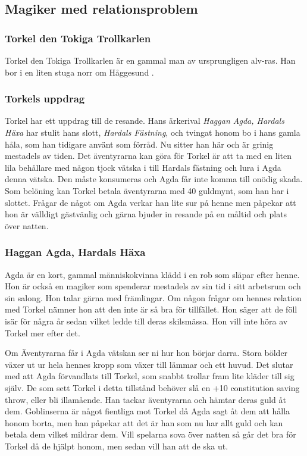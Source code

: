 \subsection{Magiker med relationsproblem}
\label{magikerMedRelationsproblem}
%
\subsubsection{Torkel den Tokiga Trollkarlen}
Torkel den Tokiga Trollkarlen är en gammal man av ursprungligen alv-ras. Han bor i en liten stuga norr om Håggesund \sectiondescribe{\ref{torkelsStuga}}.
%
\subsubsection{Torkels uppdrag}
Torkel har ett uppdrag till de resande. Hans ärkerival \textit{Haggan Agda, Hardals Häxa} har stulit hans slott, \textit{Hardals Fästning}, och tvingat honom bo i hans gamla håla, som han tidigare använt som förråd. Nu sitter han här och är grinig mestadels av tiden. Det äventyrarna kan göra för Torkel är att ta med en liten lila behållare med någon tjock vätska i till Hardals fästning och lura i Agda denna vätska. Den måste konsumeras och Agda får inte komma till onödig skada. Som belöning kan Torkel betala äventyrarna med 40 guldmynt, som han har i slottet. Frågar de något om Agda verkar han lite sur på henne men påpekar att hon är välldigt gästvänlig och gärna bjuder in resande på en måltid och plats över natten.
%
\subsubsection{Haggan Agda, Hardals Häxa}
\label{hagganAgda}
Agda är en kort, gammal människokvinna klädd i en rob som släpar efter henne. Hon är också en magiker som spenderar mestadels av sin tid i sitt arbetsrum och sin salong. Hon talar gärna med främlingar. Om någon frågar om hennes relation med Torkel nämner hon att den inte är så bra för tillfället. Hon säger att de föll isär för några år sedan vilket ledde till deras skilsmässa. Hon vill inte höra av Torkel mer efter det.

Om Äventyrarna får i Agda vätskan ser ni hur hon börjar darra. Stora bölder växer ut ur hela hennes kropp som växer till lämmar och ett huvud. Det slutar med att Agda förvandlats till Torkel, som snabbt trollar fram lite kläder till sig själv. De som sett Torkel i detta tillstånd behöver slå en +10 constitution saving throw, eller bli illamående. Han tackar äventyrarna och hämtar deras guld åt dem. Goblinserna är något fientliga mot Torkel då Agda sagt åt dem att hålla honom borta, men han påpekar att det är han som nu har allt guld och kan betala dem vilket mildrar dem. Vill spelarna sova över natten så går det bra för Torkel då de hjälpt honom, men sedan vill han att de ska ut. 

